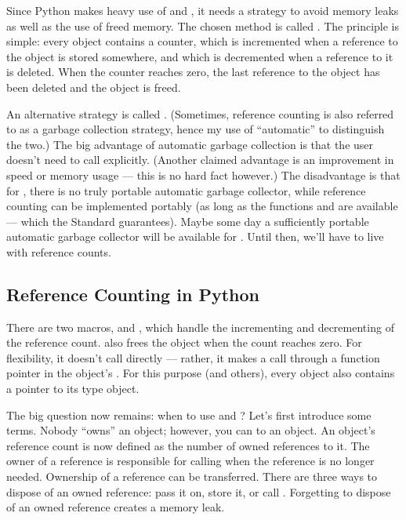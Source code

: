 \documentclass[twoside,openright]{report}
\begin{document}
Since Python makes heavy use of  and , it
needs a strategy to avoid memory leaks as well as the use of freed
memory.  The chosen method is called .  The
principle is simple: every object contains a counter, which is
incremented when a reference to the object is stored somewhere, and
which is decremented when a reference to it is deleted.  When the
counter reaches zero, the last reference to the object has been
deleted and the object is freed.

An alternative strategy is called .
(Sometimes, reference counting is also referred to as a garbage
collection strategy, hence my use of ``automatic'' to distinguish the
two.)  The big advantage of automatic garbage collection is that the
user doesn't need to call  explicitly.  (Another claimed
advantage is an improvement in speed or memory usage --- this is no
hard fact however.)  The disadvantage is that for \C{}, there is no
truly portable automatic garbage collector, while reference counting
can be implemented portably (as long as the functions 
and  are available --- which the \C{} Standard guarantees).
Maybe some day a sufficiently portable automatic garbage collector
will be available for \C{}.  Until then, we'll have to live with
reference counts.

\subsection{Reference Counting in Python}

There are two macros,  and ,
which handle the incrementing and decrementing of the reference count.
 also frees the object when the count reaches zero.
For flexibility, it doesn't call  directly --- rather, it
makes a call through a function pointer in the object's .  For this purpose (and others), every object also contains a
pointer to its type object.

The big question now remains: when to use  and
?  Let's first introduce some terms.  Nobody
``owns'' an object; however, you can  to an
object.  An object's reference count is now defined as the number of
owned references to it.  The owner of a reference is responsible for
calling  when the reference is no longer needed.
Ownership of a reference can be transferred.  There are three ways to
dispose of an owned reference: pass it on, store it, or call
.  Forgetting to dispose of an owned reference creates
a memory leak.
\end{document}
